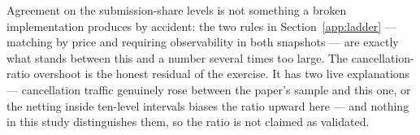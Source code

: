 

Agreement on the submission-share levels is not something a broken
implementation produces by accident: the two rules in
Section~\ref{app:ladder} --- matching by price and requiring observability in
both snapshots --- are exactly what stands between this and a number several
times too large. The cancellation-ratio overshoot is the honest residual of
the exercise. It has two live explanations --- cancellation traffic genuinely
rose between the paper's sample and this one, or the netting inside
ten-level intervals biases the ratio upward here --- and nothing in this
study distinguishes them, so the ratio is not claimed as validated.
